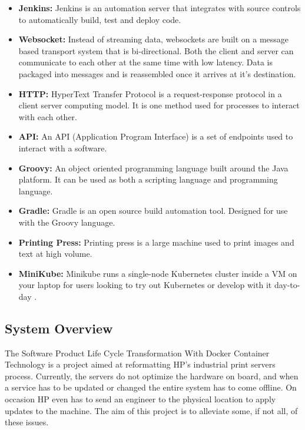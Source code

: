 \documentclass[onecolumn, draftclsnofoot,10pt, compsoc]{IEEEtran}
\begin{document}
\begin{itemize}
\item \textbf{Jenkins:} Jenkins is an automation server that integrates with source controls to automatically build, test and deploy code.

\item \textbf{Websocket:} Instead of streaming data, websockets are built on a message based transport system that is bi-directional.
Both the client and server can communicate to each other at the same time with low latency.
Data is packaged into messages and is reassembled once it arrives at it's destination.

\item \textbf{HTTP:} HyperText Transfer Protocol is a request-response protocol in a client server computing model. It is one method used for processes to interact with each other.


\item \textbf{API:} An API (Application Program Interface) is a set of endpoints used to interact with a software.

\item \textbf{Groovy:} An object oriented programming language built around the Java platform. It can be used as both a scripting language and programming language.

\item \textbf{Gradle:} Gradle is an open source build automation tool. Designed for use with the Groovy language.

\item \textbf{Printing Press:} Printing press is a large machine used to print images and text at high volume.

\item \textbf{MiniKube:} Minikube runs a single-node Kubernetes cluster inside a VM on your laptop for users looking to try out Kubernetes or develop with it day-to-day \cite {minikube}.

\end{itemize}

\subsection{System Overview}

The Software Product Life Cycle Transformation With Docker Container Technology is a project aimed at reformatting HP’s industrial print servers process.
Currently, the servers do not optimize the hardware on board, and when a service has to be updated or changed the entire system has to come offline.
On occasion HP even has to send an engineer to the physical location to apply updates to the machine.
The aim of this project is to alleviate some, if not all, of these issues.
\end{document}
